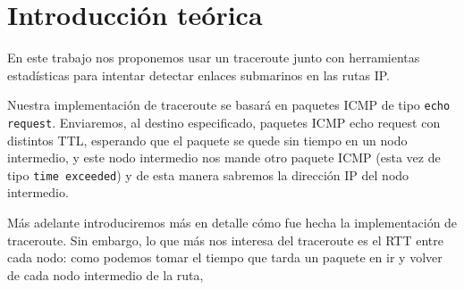 \section{Introducci\'on te\'orica}

En este trabajo nos proponemos usar un traceroute junto con herramientas estadísticas para intentar detectar enlaces submarinos en las rutas IP. 

Nuestra implementación de traceroute se basará en paquetes ICMP de tipo \texttt{echo request}. Enviaremos, al destino especificado, paquetes ICMP echo request con distintos TTL, esperando que el paquete se quede sin tiempo en un nodo intermedio, y este nodo intermedio nos mande otro paquete ICMP (esta vez de tipo \texttt{time exceeded}) y de esta manera sabremos la dirección IP del nodo intermedio.


Más adelante introduciremos más en detalle cómo fue hecha la implementación de traceroute. Sin embargo, lo que más nos interesa del traceroute es el RTT entre cada nodo: como podemos tomar el tiempo que tarda un paquete en ir y volver de cada nodo intermedio de la ruta, 
